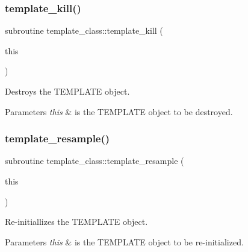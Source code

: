 \subsubsection{\texorpdfstring{template\+\_\+kill()}{template\_kill()}}
{\footnotesize\ttfamily subroutine template\+\_\+class\+::template\+\_\+kill (\begin{DoxyParamCaption}\item[{type(\hyperlink{structtemplate__class_1_1template}{template}), intent(inout)}]{this }\end{DoxyParamCaption})\hspace{0.3cm}{\ttfamily [private]}}



Destroys the T\+E\+M\+P\+L\+A\+TE object. 


\begin{DoxyParams}{Parameters}
{\em this} & is the T\+E\+M\+P\+L\+A\+TE object to be destroyed. \\
\hline
\end{DoxyParams}
\mbox{\label{namespacetemplate__class_ad296ef0f288e19f326fd85ec615223cf}} 
\subsubsection{\texorpdfstring{template\+\_\+resample()}{template\_resample()}}
{\footnotesize\ttfamily subroutine template\+\_\+class\+::template\+\_\+resample (\begin{DoxyParamCaption}\item[{type(\hyperlink{structtemplate__class_1_1template}{template}), intent(inout)}]{this }\end{DoxyParamCaption})\hspace{0.3cm}{\ttfamily [private]}}



Re-\/initiallizes the T\+E\+M\+P\+L\+A\+TE object. 


\begin{DoxyParams}{Parameters}
{\em this} & is the T\+E\+M\+P\+L\+A\+TE object to be re-\/initialized. \\
\hline
\end{DoxyParams}
\mbox{\label{namespacetemplate__class_a35aadd43e518eec1e9fab596d018441c}} 
